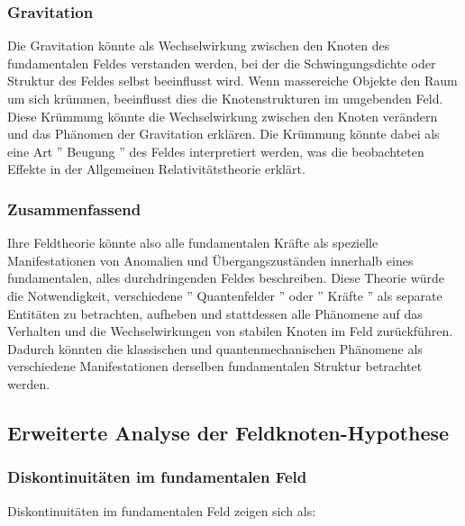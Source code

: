 \documentclass[12pt,a4paper]{article}
\begin{document}
	\subsubsection{Gravitation}
	Die Gravitation könnte als Wechselwirkung zwischen den Knoten des fundamentalen Feldes verstanden werden, bei der die Schwingungsdichte oder Struktur des Feldes selbst beeinflusst wird. Wenn massereiche Objekte den Raum um sich krümmen, beeinflusst dies die Knotenstrukturen im umgebenden Feld. Diese Krümmung könnte die Wechselwirkung zwischen den Knoten verändern und das Phänomen der Gravitation erklären. Die Krümmung könnte dabei als eine Art '' Beugung '' des Feldes interpretiert werden, was die beobachteten Effekte in der Allgemeinen Relativitätstheorie erklärt.
	
	\subsubsection{Zusammenfassend}
	Ihre Feldtheorie könnte also alle fundamentalen Kräfte als spezielle Manifestationen von Anomalien und Übergangszuständen innerhalb eines fundamentalen, alles durchdringenden Feldes beschreiben. Diese Theorie würde die Notwendigkeit, verschiedene '' Quantenfelder '' oder '' Kräfte '' als separate Entitäten zu betrachten, aufheben und stattdessen alle Phänomene auf das Verhalten und die Wechselwirkungen von stabilen Knoten im Feld zurückführen. Dadurch könnten die klassischen und quantenmechanischen Phänomene als verschiedene Manifestationen derselben fundamentalen Struktur betrachtet werden.
	
	
	
	\subsection{Erweiterte Analyse der Feldknoten-Hypothese}
	
	\subsubsection{Diskontinuitäten im fundamentalen Feld}
	Diskontinuitäten im fundamentalen Feld zeigen sich als:
	
\end{document}
